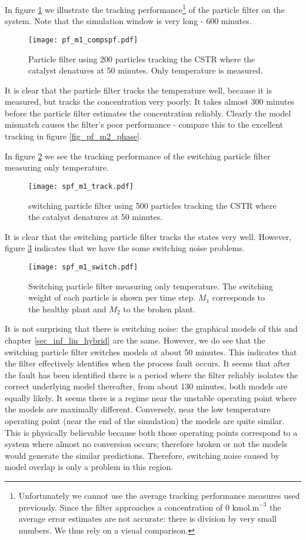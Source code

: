 In figure \ref{fig_pf_m1_compspf} we illustrate the tracking performance\footnote{Unfortunately we cannot use the average tracking performance measures used previously. Since the filter approaches a concentration of 0 $\text{kmol.m}^{-3}$ the average error estimates are not accurate: there is division by very small numbers. We thus rely on a visual comparison.} of the particle filter on the system. Note that the simulation window is very long - 600 minutes.
\begin{figure}[H] 
\centering
\texttt{[image: pf\_m1\_compspf.pdf]}
\caption{Particle filter using 200 particles tracking the CSTR where the catalyst denatures at 50 minutes. Only temperature is measured.}
\label{fig_pf_m1_compspf}
\end{figure}
It is clear that the particle filter tracks the temperature well, because it is measured, but tracks the concentration very poorly. It takes almost 300 minutes before the particle filter estimates the concentration reliably. Clearly the model mismatch causes the filter's poor performance - compare this to the excellent tracking in figure \ref{fig_pf_m2_phase}.

In figure \ref{fig_spf_m1_track} we see the tracking performance of the switching particle filter measuring only temperature.
\begin{figure}[H] 
\centering
\texttt{[image: spf\_m1\_track.pdf]}
\caption{switching particle filter using 500 particles tracking the CSTR where the catalyst denatures at 50 minutes.}
\label{fig_spf_m1_track}
\end{figure}
It is clear that the switching particle filter tracks the states very well. However, figure \ref{fig_spf_m1_switch} indicates that we have the some switching noise problems.
\begin{figure}[H] 
\centering
\texttt{[image: spf\_m1\_switch.pdf]}
\caption{Switching particle filter measuring only temperature. The switching weight of each particle is shown per time step. $M_1$ corresponds to the healthy plant and $M_2$ to the broken plant.}
\label{fig_spf_m1_switch}
\end{figure} 
It is not surprising that there is switching noise: the graphical models of this and chapter \ref{sec_inf_lin_hybrid} are the same. However, we do see that the switching particle filter switches models at about 50 minutes. This indicates that the filter effectively identifies when the process fault occurs. It seems that after the fault has been identified there is a period where the filter reliably isolates the correct underlying model thereafter, from about 130 minutes, both models are equally likely. It seems there is a regime near the unstable operating point where the models are maximally different. Conversely, near the low temperature operating point (near the end of the simulation) the models are quite similar. This is physically believable because both those operating points correspond to a system where almost no conversion occurs; therefore broken or not the models would generate the similar predictions. Therefore, switching noise caused by model overlap is only a problem in this region.

